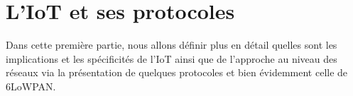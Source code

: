 
\section{L'IoT et ses protocoles}

Dans cette première partie, nous allons définir plus en détail quelles sont les implications et les spécificités de l'IoT ainsi que de l'approche au niveau des réseaux via la présentation de quelques protocoles et bien évidemment celle de 6LoWPAN.





